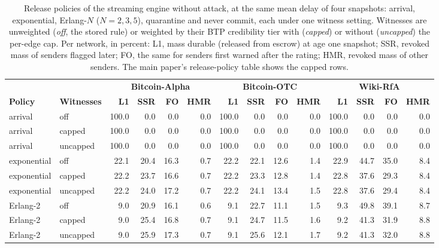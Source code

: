 \begin{table}[!t]
\centering
\scriptsize
\setlength{\tabcolsep}{3pt}
\caption{Release policies of the streaming engine without attack, at the same mean delay of four snapshots: arrival, exponential, Erlang-$N$ ($N = 2, 3, 5$), quarantine and never commit, each under one witness setting. Witnesses are unweighted (\emph{off}, the stored rule) or weighted by their BTP credibility tier with (\emph{capped}) or without (\emph{uncapped}) the per-edge cap. Per network, in percent: L1, mass durable (released from escrow) at age one snapshot; SSR, revoked mass of senders flagged later; FO, the same for senders first warned after the rating; HMR, revoked mass of other senders. The main paper's release-policy table shows the capped rows.}
\label{tab:s_s_release_policies}
\begin{tabular}{@{}llrrrrrrrrrrrr@{}}
\toprule
 &  & \multicolumn{4}{c}{\textbf{Bitcoin-Alpha}} & \multicolumn{4}{c}{\textbf{Bitcoin-OTC}} & \multicolumn{4}{c}{\textbf{Wiki-RfA}} \\
\cmidrule(lr){3-6}\cmidrule(lr){7-10}\cmidrule(lr){11-14}
\textbf{Policy} & \textbf{Witnesses} & \textbf{L1} & \textbf{SSR} & \textbf{FO} & \textbf{HMR} & \textbf{L1} & \textbf{SSR} & \textbf{FO} & \textbf{HMR} & \textbf{L1} & \textbf{SSR} & \textbf{FO} & \textbf{HMR} \\
\midrule
arrival & off & 100.0 & 0.0 & 0.0 & 0.0 & 100.0 & 0.0 & 0.0 & 0.0 & 100.0 & 0.0 & 0.0 & 0.0 \\
arrival & capped & 100.0 & 0.0 & 0.0 & 0.0 & 100.0 & 0.0 & 0.0 & 0.0 & 100.0 & 0.0 & 0.0 & 0.0 \\
arrival & uncapped & 100.0 & 0.0 & 0.0 & 0.0 & 100.0 & 0.0 & 0.0 & 0.0 & 100.0 & 0.0 & 0.0 & 0.0 \\
\midrule
exponential & off & 22.1 & 20.4 & 16.3 & 0.7 & 22.2 & 22.1 & 12.6 & 1.4 & 22.9 & 44.7 & 35.0 & 8.4 \\
exponential & capped & 22.2 & 23.7 & 16.6 & 0.7 & 22.2 & 23.3 & 12.8 & 1.4 & 22.8 & 37.6 & 29.3 & 8.4 \\
exponential & uncapped & 22.2 & 24.0 & 17.2 & 0.7 & 22.2 & 24.1 & 13.4 & 1.5 & 22.8 & 37.6 & 29.4 & 8.4 \\
\midrule
Erlang-2 & off & 9.0 & 20.9 & 16.1 & 0.6 & 9.1 & 22.7 & 11.1 & 1.5 & 9.3 & 49.8 & 39.1 & 8.7 \\
Erlang-2 & capped & 9.0 & 25.4 & 16.8 & 0.7 & 9.1 & 24.7 & 11.5 & 1.6 & 9.2 & 41.3 & 31.9 & 8.8 \\
Erlang-2 & uncapped & 9.0 & 25.9 & 17.3 & 0.7 & 9.1 & 25.6 & 12.1 & 1.7 & 9.2 & 41.3 & 32.0 & 8.8 \\

\end{tabular}
\end{table}
